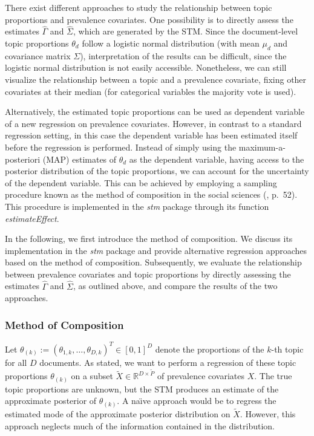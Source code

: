There exist different approaches to study the relationship between topic proportions and prevalence covariates. One possibility is to directly assess the estimates $\hat{\Gamma}$ and $\hat{\Sigma}$, which are generated by the STM. Since the document-level topic proportions $\theta_d$ follow a logistic normal distribution (with mean $\mu_d$ and covariance matrix $\Sigma$), interpretation of the results can be difficult, since the logistic normal distribution is not easily accessible. Nonetheless, we can still visualize the relationship between a topic and a prevalence covariate, fixing other covariates at their median (for categorical variables the majority vote is used).

Alternatively, the estimated topic proportions can be used as dependent variable of a new regression on prevalence covariates. However, in contrast to a standard regression setting, in this case the dependent variable has been estimated itself before the regression is performed. Instead of simply using the maximum-a-posteriori (MAP) estimates of $\theta_d$ as the dependent variable, having access to the posterior distribution of the topic proportions, we can account for the uncertainty of the dependent variable. This can be achieved by employing a sampling procedure known as the method of composition in the social sciences  (\citealp{tanner2012tools}, p.\ 52). This procedure is implemented in the \textit{stm} package through its function \textit{estimateEffect}.

In the following, we first introduce the method of composition. We discuss its implementation in the \textit{stm} package and provide alternative regression approaches based on the method of composition. Subsequently, we evaluate the relationship between prevalence covariates and topic proportions by directly assessing the estimates $\hat{\Gamma}$ and $\hat{\Sigma}$, as outlined above, and compare the results of the two approaches.

\subsubsection{Method of Composition}
\label{Method of Composition}

Let $\theta_{(k)}:=(\theta_{1,k}, \dots, \theta_{D,k})^T \in [0,1]^{D}$ denote the proportions of the $k$-th topic for all $D$ documents. As stated, we want to perform a regression of these topic proportions $\theta_{(k)}$ on a subset $\tilde{X} \in \mathbb{R}^{D \times \tilde{P}}$ of prevalence covariates $X$. The true topic proportions are unknown, but the STM produces an estimate of the approximate posterior of $\theta_{(k)}$. A na{\"\i}ve approach would be to regress the estimated mode of the approximate posterior distribution on $\tilde{X}$. However, this approach neglects much of the information contained in the distribution. 

